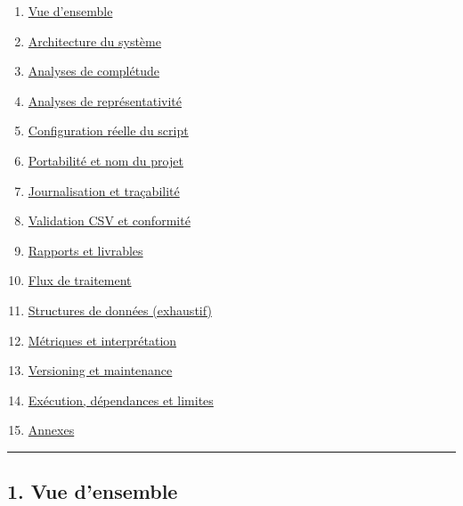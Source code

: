 \begin{enumerate}
\def\labelenumi{\arabic{enumi}.}
\tightlist
\item
  \hyperref[1-vue-densemble]{Vue d'ensemble}
\item
  \hyperref[2-architecture-du-systux5cux25C3ux5cux25A8me]{Architecture
  du système}
\item
  \hyperref[3-analyses-de-complux5cux25C3ux5cux25A9tude]{Analyses de
  complétude}
\item
  \hyperref[4-analyses-de-reprux5cux25C3ux5cux25A9sentativitux5cux25C3ux5cux25A9]{Analyses
  de représentativité}
\item
  \hyperref[5-configuration-rux5cux25C3ux5cux25A9elle-du-script]{Configuration
  réelle du script}
\item
  \hyperref[6-portabilitux5cux25C3ux5cux25A9-et-nom-du-projet]{Portabilité
  et nom du projet}
\item
  \hyperref[7-journalisation-et-traux5cux25C3ux5cux25A7abilitux5cux25C3ux5cux25A9]{Journalisation
  et traçabilité}
\item
  \hyperref[8-validation-csv-et-conformitux5cux25C3ux5cux25A9]{Validation
  CSV et conformité}
\item
  \hyperref[9-rapports-et-livrables]{Rapports et livrables}
\item
  \hyperref[9-flux-de-traitement]{Flux de traitement}
\item
  \hyperref[10-structures-de-donnux5cux25C3ux5cux25A9es-exhaustif]{Structures
  de données (exhaustif)}
\item
  \hyperref[11-mux5cux25C3ux5cux25A9triques-et-interprux5cux25C3ux5cux25A9tation]{Métriques
  et interprétation}
\item
  \hyperref[12-versioning-et-maintenance]{Versioning et maintenance}
\item
  \hyperref[13-exux5cux25C3ux5cux25A9cution-dux5cux25C3ux5cux25A9pendances-et-limites]{Exécution,
  dépendances et limites}
\item
  \hyperref[14-annexes]{Annexes}
\end{enumerate}

\begin{center}\rule{0.5\linewidth}{0.5pt}\end{center}

\subsection{1. Vue d'ensemble}\label{vue-densemble}

